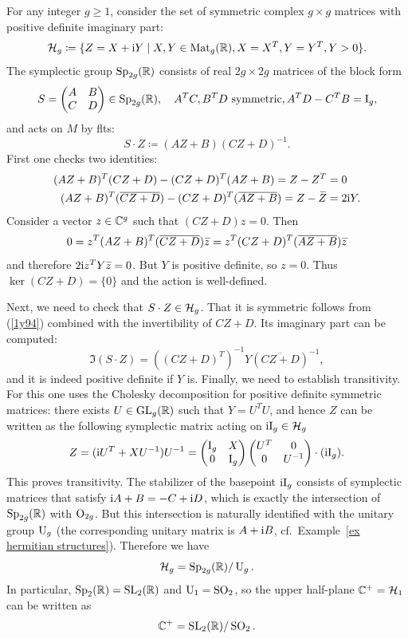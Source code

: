\begin{example}\label{ex siegel upper half-space}
    For any integer $g\geq 1$, consider the set of symmetric complex $g\times g$ matrices with positive definite imaginary part:
    \[\mathcal{H}_g \coloneqq \{Z=X+\mathrm{i} Y\mid X,Y\in \operatorname{Mat}_g(\mathbb{R}), X=X^T, Y=Y^T, Y>0\}.\]
    The symplectic group $\operatorname{Sp}_{2g}(\mathbb{R})$ consists of real $2g\times 2g$ matrices of the block form 
    \[S=\begin{pmatrix}
        A & B\\
        C & D
    \end{pmatrix}\in\operatorname{Sp}_{2g}(\mathbb{R}),\quad A^T C,B^TD\text{ symmetric}, A^TD-C^TB=\mathrm{I}_g,\]
    and acts on $M$ by \glspl{flt}:
    \[S\cdot Z\coloneqq (AZ+B)(CZ+D)^{-1}.\]
    First one checks two identities:
    \begin{align}
        (AZ+B)^T (CZ+D)-(CZ+D)^T(AZ+B)=Z-Z^T&=0\label{1y94}\\
        (AZ+B)^T (\overline{CZ+D})-(CZ+D)^T(\overline{AZ+B})=Z-\wb{Z}&=2\i Y.\label{13702}
    \end{align}
    Consider a vector $z\in\mathbb{C}^g$ such that $(CZ+D)z=0$. Then 
    \[0=z^T (AZ+B)^T(\overline{CZ+D})\wb{z}=z^T (CZ+D)^T(\overline{AZ+B})\wb{z}\]
    and therefore $2\i z^T Y \wb{z}=0$. But $Y$ is positive definite, so $z=0$. Thus $\ker(CZ+D)=\{0\}$ and the action is well-defined.

    Next, we need to check that $S\cdot Z\in \mathcal{H}_g$. That it is symmetric follows from (\ref{1y94}) combined with the invertibility of $CZ+D$. Its imaginary part can be computed:
    \[\Im (S\cdot Z)=((CZ+D)^T)^{-1}Y(\overline{CZ+D})^{-1},\]
    and it is indeed positive definite if $Y$ is. Finally, we need to establish transitivity. For this one uses the Cholesky decomposition for positive definite symmetric matrices: there exists $U\in\operatorname{GL}_g(\mathbb{R})$ such that $Y=U^TU$, and hence $Z$ can be written as the following symplectic matrix acting on $\mathrm{i} \mathrm{I}_g\in \mathcal{H}_g$
    \[Z=(\mathrm{i} U^T+XU^{-1})U^{-1}=\begin{pmatrix}
        \mathrm{I}_g & X\\
        0 & \mathrm{I}_g
    \end{pmatrix}\begin{pmatrix}
        U^T & 0\\
        0 & U^{-1}
    \end{pmatrix}\cdot(\mathrm{i} \mathrm{I}_g).\]
    This proves transitivity. The stabilizer of the basepoint $\mathrm{i} \mathrm{I}_g$ consists of symplectic matrices that satisfy $\mathrm{i} A+B=-C+\mathrm{i} D$, which is exactly the intersection of $\operatorname{Sp}_{2g}(\mathbb{R})$ with $\operatorname{O}_{2g}$. But this intersection is naturally identified with the unitary group $\operatorname{U}_g$ (the corresponding unitary matrix is $A+\mathrm{i} B$, cf.\ Example~\ref{ex hermitian structures}). Therefore we have 
    \[\mathcal{H}_g = \operatorname{Sp}_{2g}(\mathbb{R})\slash \operatorname{U}_g.\]
    In particular, $\operatorname{Sp}_2(\mathbb{R})=\operatorname{SL}_2(\mathbb{R})$ and $\operatorname{U}_1=\operatorname{SO}_2$, so the upper half-plane $\mathbb{C}^+=\mathcal{H}_1$ can be written as 
    \[\mathbb{C}^+=\operatorname{SL}_2(\mathbb{R})\slash \operatorname{SO}_2.\]
\end{example}
